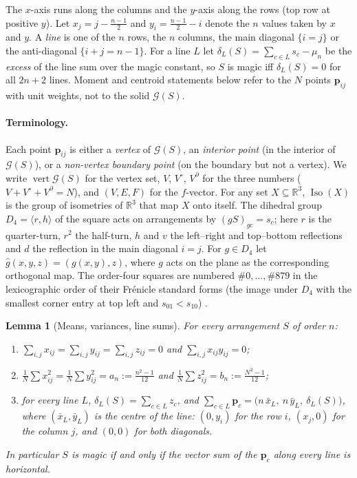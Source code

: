 \documentclass[11pt,a4paper]{article}
\theoremstyle{plain}
\newtheorem{lemma}[theorem]{Lemma}
\theoremstyle{definition}
\theoremstyle{remark}
\newcommand{\R}{\mathbb{R}}
\begin{document}
The $x$-axis runs along the columns and the $y$-axis along the rows (top row at positive $y$).
Let $x_j=j-\frac{n-1}2$ and $y_i=\frac{n-1}2-i$ denote the $n$ values taken by $x$ and $y$.
A \emph{line} is one of the $n$ rows, the $n$ columns, the main diagonal $\{i=j\}$ or the anti-diagonal $\{i+j=n-1\}$.
For a line $L$ let $\delta_L(S)=\sum_{c\in L}s_c-\mu_n$ be the \emph{excess} of the line sum over the magic constant, so $S$ is magic iff $\delta_L(S)=0$ for all $2n+2$ lines.
Moment and centroid statements below refer to the $N$ points $\mathbf p_{ij}$ with unit weights, not to the solid $\mathcal G(S)$.

\paragraph{Terminology.}
Each point $\mathbf p_{ij}$ is either a \emph{vertex} of $\mathcal G(S)$, an \emph{interior point} (in the interior of $\mathcal G(S)$), or a \emph{non-vertex boundary point} (on the boundary but not a vertex).
We write $\operatorname{vert}\mathcal G(S)$ for the vertex set, $V$, $V^\circ$, $V^\partial$ for the three numbers ($V+V^\circ+V^\partial=N$), and $(V,E,F)$ for the $f$-vector.
For any set $X\subseteq\R^3$, $\operatorname{Iso}(X)$ is the group of isometries of $\R^3$ that map $X$ onto itself.
The dihedral group $D_4=\langle r,h\rangle$ of the square acts on arrangements by $(gS)_{gc}=s_c$; here $r$ is the quarter-turn, $r^2$ the half-turn, $h$ and $v$ the left--right and top--bottom reflections and $d$ the reflection in the main diagonal $i=j$.
For $g\in D_4$ let $\hat g(x,y,z)=(g(x,y),z)$, where $g$ acts on the plane as the corresponding orthogonal map.
The order-four squares are numbered $\#0,\dots,\#879$ in the lexicographic order of their Fr\'enicle standard forms (the image under $D_4$ with the smallest corner entry at top left and $s_{01}<s_{10}$) \cite{frenicle1693}.

\begin{lemma}[Means, variances, line sums]
\label{lem:lines}
For every arrangement $S$ of order $n$:
\begin{enumerate}
\item $\sum_{i,j}x_{ij}=\sum_{i,j}y_{ij}=\sum_{i,j}z_{ij}=0$ and $\sum_{i,j}x_{ij}y_{ij}=0$;
\item $\frac1N\sum x_{ij}^2=\frac1N\sum y_{ij}^2=a_n:=\frac{n^{2}-1}{12}$ and $\frac1N\sum z_{ij}^2=b_n:=\frac{N^{2}-1}{12}$;
\item for every line $L$, $\delta_L(S)=\sum_{c\in L}z_c$, and
$\sum_{c\in L}\mathbf p_c=\bigl(n\,\bar x_L,\ n\,\bar y_L,\ \delta_L(S)\bigr)$,
where $(\bar x_L,\bar y_L)$ is the centre of the line: $(0,y_i)$ for the row $i$, $(x_j,0)$ for the column $j$, and $(0,0)$ for both diagonals.
\end{enumerate}
In particular $S$ is magic if and only if the vector sum of the $\mathbf p_c$ along every line is horizontal.
\end{lemma}
\end{document}
